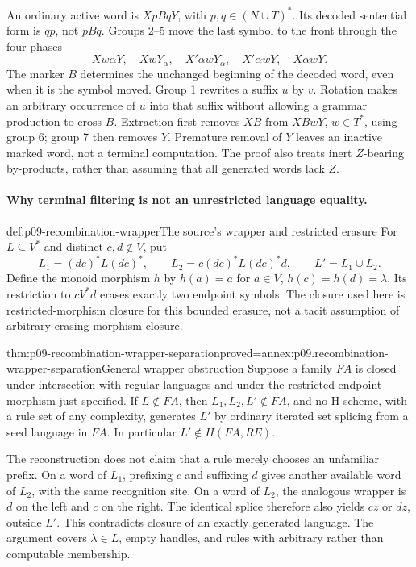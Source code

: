 An ordinary active word is \(XpBqY\), with \(p,q\in(N\cup T)^*\).
Its decoded sentential form is \(qp\), not \(pBq\).
Groups 2--5 move the last symbol to the front through the four phases
\[
 Xw\alpha Y,\quad XwY_\alpha,\quad
 X'\alpha wY_\alpha,\quad X'\alpha wY,\quad X\alpha wY.
\]
The marker \(B\) determines the unchanged beginning of the decoded word,
even when it is the symbol moved. Group 1 rewrites a suffix \(u\) by \(v\).
Rotation makes an arbitrary occurrence of \(u\) into that suffix without
allowing a grammar production to cross \(B\).
Extraction first removes \(XB\) from \(XBwY\), \(w\in T^*\), using
group 6; group 7 then removes \(Y\).
Premature removal of \(Y\) leaves an inactive marked word, not a terminal
computation. The proof also treats inert \(Z\)-bearing by-products, rather
than assuming that all generated words lack \(Z\).

\paragraph{Why terminal filtering is not an unrestricted language equality.}

\begin{hbdefinition}{def:p09-recombination-wrapper}{The source's wrapper and restricted erasure}
For \(L\subseteq V^*\) and distinct \(c,d\notin V\), put
\[
 L_1=(dc)^*L(dc)^*,\qquad
 L_2=c(dc)^*L(dc)^*d,\qquad L'=L_1\cup L_2.
\]
Define the monoid morphism \(h\) by \(h(a)=a\) for \(a\in V\),
\(h(c)=h(d)=\lambda\). Its restriction to \(cV^*d\) erases exactly
two endpoint symbols. The closure used here is restricted-morphism closure
for this bounded erasure, not a tacit assumption of arbitrary erasing
morphism closure.
\end{hbdefinition}

\begin{hbtheorem}{thm:p09-recombination-wrapper-separation}{proved=annex:p09.recombination-wrapper-separation}{General wrapper obstruction}
Suppose a family \(FA\) is closed under intersection with regular
languages and under the restricted endpoint morphism just specified.
If \(L\notin FA\), then \(L_1,L_2,L'\notin FA\), and no H scheme,
with a rule set of any complexity, generates \(L'\) by ordinary iterated
set splicing from a seed language in \(FA\).
In particular \(L'\notin H(FA,RE)\).
\end{hbtheorem}

The reconstruction does not claim that a rule merely chooses an unfamiliar
prefix. On a word of \(L_1\), prefixing \(c\) and suffixing \(d\) gives
another available word of \(L_2\), with the same recognition site.
On a word of \(L_2\), the analogous wrapper is \(d\) on the left and
\(c\) on the right. The identical splice therefore also yields \(cz\)
or \(dz\), outside \(L'\). This contradicts closure of an exactly
generated language. The argument covers \(\lambda\in L\), empty
handles, and rules with arbitrary rather than computable membership.

